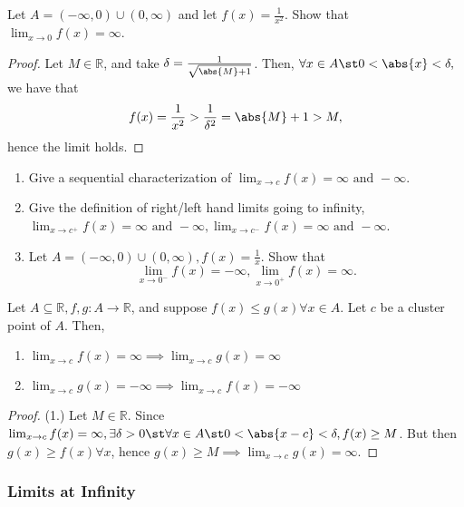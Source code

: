 \documentclass[12pt]{article}
\begin{document}
\begin{example}
  Let $A = (-\infty, 0) \cup (0, \infty)$ and let $f(x) = \frac{1}{x^2}$. Show that $\lim_{x \to 0} f(x) = \infty$.
  \begin{proof}
    Let $M \in \mathbb{R}$, and take $\delta = \frac{1}{\sqrt{\abs{M} + 1}}$. Then, $\forall x \in A \st 0 < \abs{x} < \delta,$ we have that \[
    f(x) = \frac{1}{x^2} > \frac{1}{\delta^2} = \abs{M}+1   > M,
    \]
    hence the limit holds.
  \end{proof}
\end{example}

\begin{example}
  \begin{enumerate}
    \item Give a sequential characterization of $\lim_{x\to c} f(x) = \infty \text{ and } - \infty$.
    \item Give the definition of right/left hand limits going to infinity, $\lim_{x\to c^+} f(x) =  \infty \text{ and }- \infty, \lim_{x\to c^-} f(x) = \infty \text{ and }- \infty$.
    \item Let $A = (-\infty, 0)\cup(0,\infty), f(x) = \frac{1}{x}$. Show that $$\lim_{x\to 0^-} f(x) = -\infty, \lim_{x\to 0^+} f(x) = \infty.$$
  \end{enumerate}
\end{example}

\begin{proposition}\label{prop:orderpropertiesofinfinitelimits}
  Let $A \subseteq \mathbb{R}, f, g: A \to \mathbb{R}$, and suppose $f(x) \leq g(x) \forall x \in A$. Let $c$ be a cluster point of $A$. Then, \begin{enumerate}
    \item $\lim_{x\to c}f(x) = \infty \implies \lim_{x\to c} g(x) = \infty$
    \item $\lim_{x\to c}g(x) = -\infty \implies \lim_{x\to c} f(x) = -\infty$
  \end{enumerate}
\end{proposition}
\begin{proof}(1.) Let $M \in \mathbb{R}$. Since $\lim_{x\to c} f(x) = \infty, \exists \delta>0 \st \forall x \in A \st 0 < \abs{x - c} < \delta, f(x) \geq M$. But then $g(x) \geq f(x) \forall x$, hence $g(x) \geq M \implies \lim_{x\to c} g(x) = \infty$.
\end{proof}

\subsubsection{Limits at Infinity}
\end{document}
